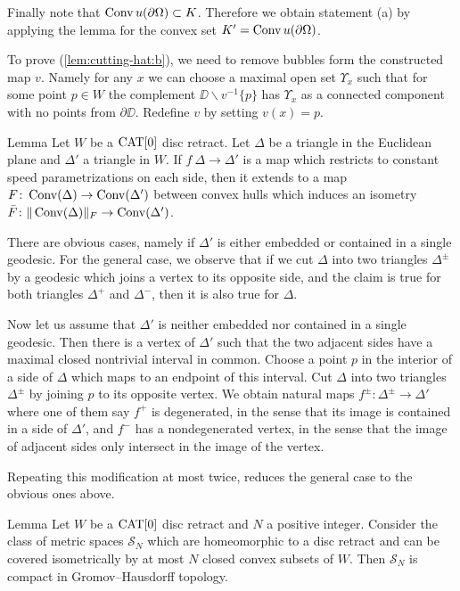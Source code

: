 \documentclass{article}
\begin{document}
Finally note that $\mathop{\rm Conv}\nolimits u(\partial\Omega)\subset K$. 
Therefore we obtain statement (a) 
by applying the lemma for the convex set $K'=\mathop{\rm Conv}\nolimits u(\partial\Omega)$.

To prove (\ref{lem:cutting-hat:b}), we need to remove bubbles form the constructed map $v$.
Namely for any $x$ we can choose a maximal open set $\Upsilon_x$ such that for some point $p\in W$ the complement $\DD\backslash v^{-1}\{p\}$ has $\Upsilon_x$ as a
connected component with no points from $\partial \DD$.
Redefine $v$ by setting $v(x)=p$.
\qeds

\begin{thm}{Lemma}\label{lem:isomtri}
Let $W$ be a $\mathop{\rm CAT}\nolimits[0]$ disc retract. 
Let $\Delta$ be a triangle in the Euclidean plane
and $\Delta'$ a triangle in $W$. 
If $f\:\Delta\to \Delta'$ is a map which restricts to constant speed
parametrizations on each side, then it extends to a map 
$F\colon\mathop{\rm Conv}\nolimits(\Delta)\to \mathop{\rm Conv}\nolimits(\Delta')$ between convex hulls which induces an isometry $\bar F\colon\|\mathop{\rm Conv}\nolimits(\Delta)\|_F\to \mathop{\rm Conv}\nolimits(\Delta')$. 
\end{thm}

There are obvious cases, namely if $\Delta'$ is either embedded or contained in a single geodesic. 
For the general case, we observe that if we cut $\Delta$ into two triangles $\Delta^\pm$ by a geodesic which joins a vertex to its opposite side, and  
the claim is true for both triangles $\Delta^+$ and $\Delta^-$, then it is also true for $\Delta$. 

Now let us assume that $\Delta'$ is neither embedded nor contained
in a single geodesic. 
Then there is a vertex of $\Delta'$ such that the two adjacent sides have a maximal closed nontrivial interval in common. 
Choose a point $p$ in the interior
of a side of $\Delta$ which maps to an endpoint of this interval. 
Cut $\Delta$ into two triangles $\Delta^\pm$ by joining $p$ to its opposite vertex.
We obtain natural maps $f^\pm:\Delta^\pm\to\Delta'$ where one of them say $f^+$ is degenerated, in the sense that its image is contained in a side of $\Delta'$, and $f^-$ has 
a nondegenerated vertex, in the sense that the image of adjacent sides only intersect in the image of the vertex. 

Repeating this modification at most twice,
reduces the general case to the  obvious ones above.
\qeds

\begin{thm}{Lemma}\label{lem:puzzle-compact}
Let $W$ be a $\mathop{\rm CAT}\nolimits[0]$ disc retract 
and $N$ a positive integer. 
Consider the class of metric spaces $\mathcal{S}_N$ 
which are homeomorphic to a disc retract
and can be covered isometrically by at most $N$ closed convex subsets of $W$.
Then $\mathcal{S}_N$ is compact in Gromov--Hausdorff topology.
\end{thm}
\end{document}
